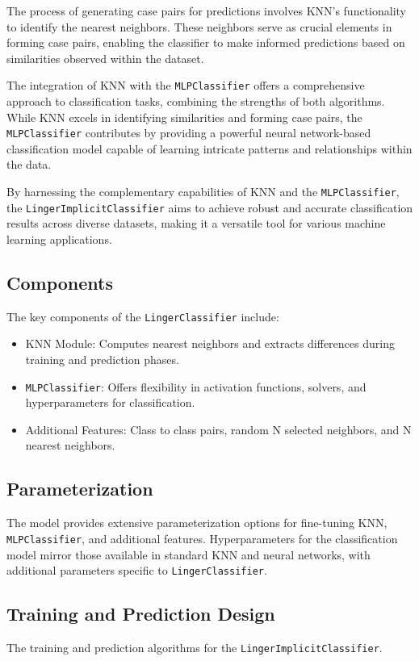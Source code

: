 \documentclass[a4paper, 12pt]{report}
\begin{document}
The process of generating case pairs for predictions involves KNN's functionality to identify the nearest neighbors. 
These neighbors serve as crucial elements in forming case pairs, enabling the classifier to make informed predictions based on similarities observed within the dataset.

The integration of KNN with the \texttt{MLPClassifier} offers a comprehensive approach to classification tasks, combining the strengths of both algorithms. 
While KNN excels in identifying similarities and forming case pairs, the \texttt{MLPClassifier} contributes 
by providing a powerful neural network-based classification model capable of learning intricate patterns and relationships within the data.

By harnessing the complementary capabilities of KNN and the \texttt{MLPClassifier}, 
the \texttt{LingerImplicitClassifier} aims to achieve robust and accurate classification results across diverse datasets,
making it a versatile tool for various machine learning applications.

\subsection{Components}
The key components of the \texttt{LingerClassifier} include:
\begin{itemize}
    \item KNN Module: Computes nearest neighbors and extracts differences during training and prediction phases.
    \item \texttt{MLPClassifier}: Offers flexibility in activation functions, solvers, and hyperparameters for classification.
    \item Additional Features: Class to class pairs, random N selected neighbors, and N nearest neighbors.
\end{itemize}

\subsection{Parameterization}
The model provides extensive parameterization options for fine-tuning KNN, \texttt{MLPClassifier}, and additional features. 
Hyperparameters for the classification model mirror those available in standard KNN and neural networks, with additional parameters specific to \texttt{LingerClassifier}.

\subsection{Training and Prediction Design}
The training and prediction algorithms for the \texttt{LingerImplicitClassifier}.
\end{document}
